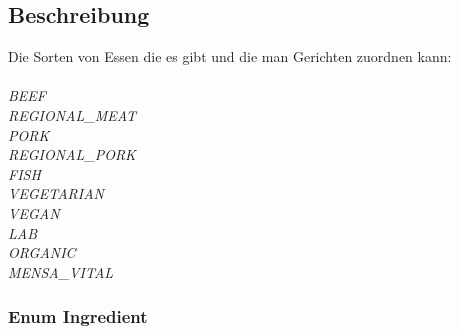 \documentclass[a4paper]{scrreprt}
\begin{document}
\subsection*{Beschreibung}
Die Sorten von Essen die es gibt und die man Gerichten zuordnen kann:
\\ \\ \textit{BEEF \\
 REGIONAL\_MEAT \\
 PORK \\
 REGIONAL\_PORK \\
 FISH \\
 VEGETARIAN \\
 VEGAN \\
 LAB \\
 ORGANIC \\
 MENSA\_VITAL \\
}

\subsubsection{Enum Ingredient}
\end{document}
